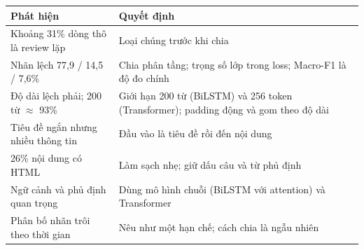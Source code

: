 \begin{center}
\begin{tabular}{@{}p{6.2cm}p{7.9cm}@{}}
    \toprule
    Phát hiện & Quyết định \\
    \midrule
    Khoảng 31\% dòng thô là review lặp & Loại chúng trước khi chia \\
    Nhãn lệch 77,9 / 14,5 / 7,6\% & Chia phân tầng; trọng số lớp trong loss; Macro-F1 là độ đo chính \\
    Độ dài lệch phải; 200 từ $\approx$ 93\% & Giới hạn 200 từ (BiLSTM) và 256 token (Transformer); padding động và gom theo độ dài \\
    Tiêu đề ngắn nhưng nhiều thông tin & Đầu vào là tiêu đề rồi đến nội dung \\
    26\% nội dung có HTML & Làm sạch nhẹ; giữ dấu câu và từ phủ định \\
    Ngữ cảnh và phủ định quan trọng & Dùng mô hình chuỗi (BiLSTM với attention) và Transformer \\
    Phân bố nhãn trôi theo thời gian & Nêu như một hạn chế; cách chia là ngẫu nhiên \\
    \bottomrule
\end{tabular}
\end{center}
